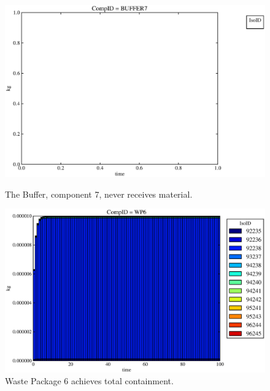\begin{figure}[ht!]
\begin{minipage}[b]{0.45\linewidth}
  \includegraphics[width=\textwidth]{./chapters/demonstration/base/lpPFMII3.eps}
  \caption[Case LPPFMII Buffer Contaminants]{
    The Buffer, component 7, never receives material.
    }
  \label{fig:lpPFMIIbuff}

\end{minipage}
\hspace{0.05\linewidth}
\begin{minipage}[b]{0.45\linewidth}
  \includegraphics[width=\textwidth]{./chapters/demonstration/base/lpPFMII2.eps}
  \caption[Case LPPFMII Waste Package Contaminants.]{ 
    Waste Package 6 achieves total containment. 
    }
  \label{fig:lpPFMIIwp6}


\end{minipage}
\end{figure}

